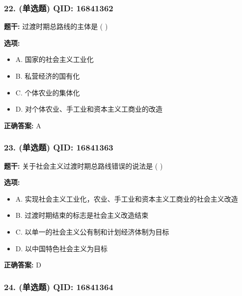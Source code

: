 \documentclass[12pt,UTF8]{ctexart}
\begin{document}
\subsubsection*{22. (单选题) \small QID: 16841362}

\textbf{题干:}
过渡时期总路线的主体是 ( )

\textbf{选项:}
\begin{itemize}[leftmargin=*]

  \item A. 国家的社会主义工业化

  \item B. 私营经济的国有化

  \item C. 个体农业的集体化

  \item D. 对个体农业、手工业和资本主义工商业的改造

\end{itemize}

\textbf{正确答案:}
A

\vspace{0.3em}\hrulefill\vspace{0.7em}

\subsubsection*{23. (单选题) \small QID: 16841363}

\textbf{题干:}
关于社会主义过渡时期总路线错误的说法是 ( )

\textbf{选项:}
\begin{itemize}[leftmargin=*]

  \item A. 实现社会主义工业化，农业、手工业和资本主义工商业的社会主义改造

  \item B. 过渡时期结束的标志是社会主义改造结束

  \item C. 以单一的社会主义公有制和计划经济体制为目标

  \item D. 以中国特色社会主义为目标

\end{itemize}

\textbf{正确答案:}
D

\vspace{0.3em}\hrulefill\vspace{0.7em}

\subsubsection*{24. (单选题) \small QID: 16841364}
\end{document}
